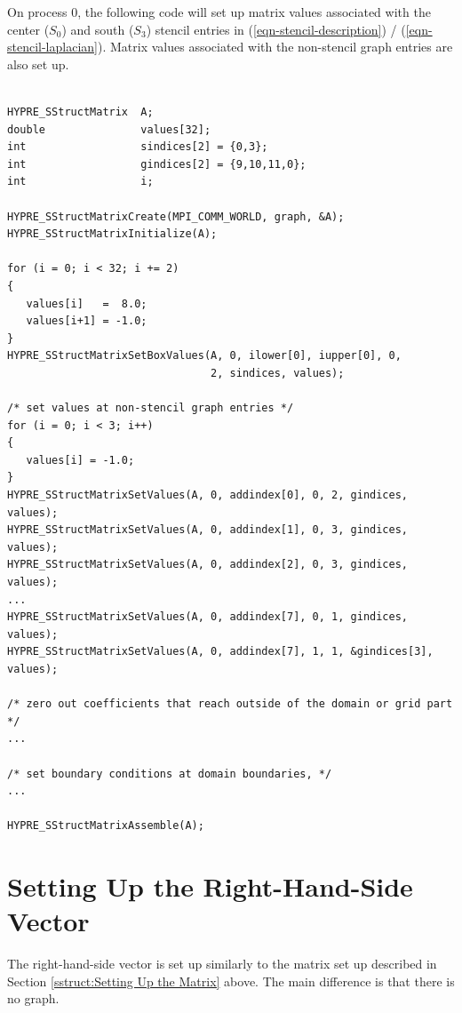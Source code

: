On process 0, the following code will set up matrix values associated
with the center ($S_0$) and south ($S_3$) stencil entries in
(\ref{eqn-stencil-description}) / (\ref{eqn-stencil-laplacian}).
Matrix values associated with the non-stencil graph entries are also
set up.
\begin{display}
\begin{verbatim}

HYPRE_SStructMatrix  A;
double               values[32];
int                  sindices[2] = {0,3};
int                  gindices[2] = {9,10,11,0};
int                  i;

HYPRE_SStructMatrixCreate(MPI_COMM_WORLD, graph, &A);
HYPRE_SStructMatrixInitialize(A);

for (i = 0; i < 32; i += 2)
{
   values[i]   =  8.0;
   values[i+1] = -1.0;
}
HYPRE_SStructMatrixSetBoxValues(A, 0, ilower[0], iupper[0], 0,
                                2, sindices, values);

/* set values at non-stencil graph entries */
for (i = 0; i < 3; i++)
{
   values[i] = -1.0;
}
HYPRE_SStructMatrixSetValues(A, 0, addindex[0], 0, 2, gindices, values);
HYPRE_SStructMatrixSetValues(A, 0, addindex[1], 0, 3, gindices, values);
HYPRE_SStructMatrixSetValues(A, 0, addindex[2], 0, 3, gindices, values);
...
HYPRE_SStructMatrixSetValues(A, 0, addindex[7], 0, 1, gindices, values);
HYPRE_SStructMatrixSetValues(A, 0, addindex[7], 1, 1, &gindices[3], values);

/* zero out coefficients that reach outside of the domain or grid part */
...

/* set boundary conditions at domain boundaries, */
...

HYPRE_SStructMatrixAssemble(A);

\end{verbatim}
\end{display}


\section{Setting Up the Right-Hand-Side Vector}
\label{sstruct:Setting Up the Right-Hand-Side Vector}

The right-hand-side vector is set up similarly to the matrix set up
described in Section \ref{sstruct:Setting Up the Matrix} above.  The
main difference is that there is no graph.


